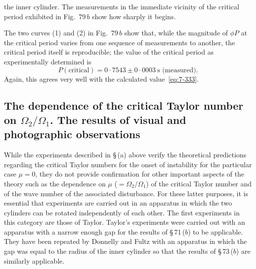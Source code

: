 
\noindent the inner cylinder.  The measurements in the immediate vicinity of the
critical period exhibited in Fig.~79\,$b$ show how sharply it begins.

The two curves (1) and (2) in Fig.~79\,$b$ show that, while the magnitude
of $\phi P$ at the critical period varies from one sequence of measurements to
another, the critical period itself is reproducible; the value of the critical
period as experimentally determined is
\begin{equation}\label{eq:7-334}
P(\text{critical}) = 0{\cdot}7543 \pm 0{\cdot}0003~\text{s (measured)}.
\end{equation}
Again, this agrees very well with the calculated value~\eqref{eq:7-333}.

\subsection{The dependence of the critical Taylor number on $\Omega_2/\Omega_1$. The results of
visual and photographic observations}\label{sec:7-74b}

While the experiments described in \S\,(a) above verify the theoretical
predictions regarding the critical Taylor numbers for the onset of
instability for the particular case $\mu = 0$, they do not provide
confirmation for other important aspects of the theory such as the
dependence on $\mu$ ($= \Omega_2/\Omega_1$) of the critical Taylor number and of the
wave number of the associated disturbance.  For these latter purposes,
it is essential that experiments are carried out in an apparatus in which
the two cylinders can be rotated independently of each other.
The first experiments in this category are those of Taylor.  Taylor's
experiments were carried out with an apparatus with a narrow enough
gap for the results of \S\,71\,($b$) to be applicable.  They have been repeated
by Donnelly and Fultz with an apparatus in which the gap was equal to
the radius of the inner cylinder so that the results of \S\,73\,($b$) are
similarly applicable.

